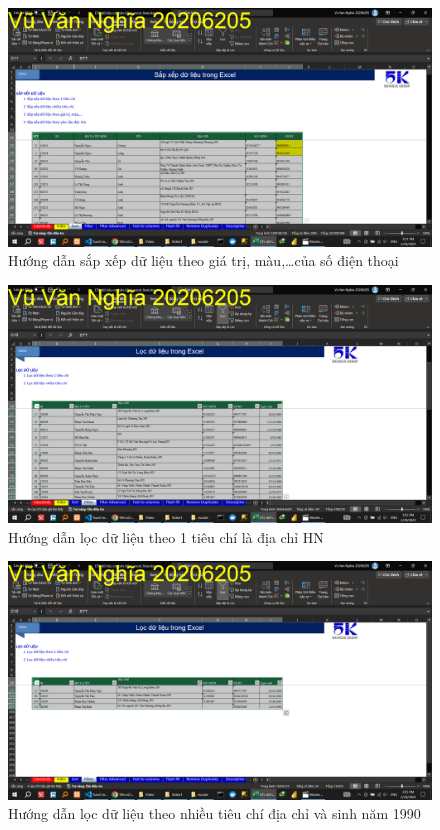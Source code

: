 \documentclass{article}
\begin{document}
\begin{figure}[H]
    \centering
    \includegraphics[scale = 0.15]{Video1/HuongDan/3.png}
    \caption{Hướng dẫn sắp xếp dữ liệu theo giá trị, màu,\dots của số điện thoại}
\end{figure}


\begin{figure}[H]
    \centering
    \includegraphics[scale = 0.15]{Video1/HuongDan/4.png}
    \caption{Hướng dẫn lọc dữ liệu theo 1 tiêu chí là địa chỉ HN}
\end{figure}


\begin{figure}[H]
    \centering
    \includegraphics[scale = 0.15]{Video1/HuongDan/5.png}
    \caption{Hướng dẫn lọc dữ liệu theo nhiều tiêu chí địa chỉ và sinh năm 1990}
\end{figure}
\end{document}
